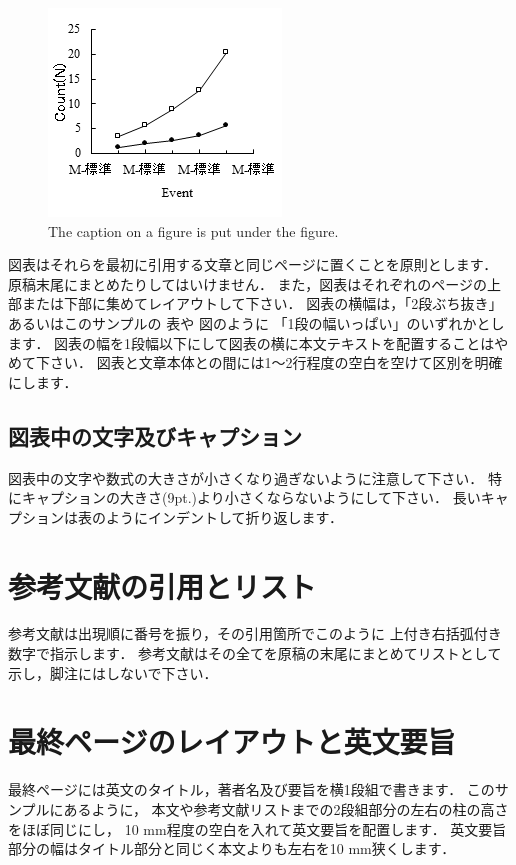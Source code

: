 \begin{figure}[H]
  \centering
  \includegraphics[keepaspectratio=true,width=0.9\linewidth,height=0.25\paperheight]{./assets/figure.png}
  \caption{The caption on a figure is put under the figure.}
  \label{figure:example figure}
\end{figure}

図表はそれらを最初に引用する文章と同じページに置くことを原則とします．
原稿末尾にまとめたりしてはいけません．
また，図表はそれぞれのページの上部または下部に集めてレイアウトして下さい．
図表の横幅は，「2段ぶち抜き」あるいはこのサンプルの
表や
図のように
「1段の幅いっぱい」のいずれかとします．
図表の幅を1段幅以下にして図表の横に本文テキストを配置することはやめて下さい．
図表と文章本体との間には1～2行程度の空白を空けて区別を明確にします．

\subsection{図表中の文字及びキャプション}

図表中の文字や数式の大きさが小さくなり過ぎないように注意して下さい．
特にキャプションの大きさ(9pt.)より小さくならないようにして下さい．
長いキャプションは表のようにインデントして折り返します．

\section{参考文献の引用とリスト}

参考文献は出現順に番号を振り，その引用箇所でこのように
\cite{物部水理学:inbook}
上付き右括弧付き数字で指示します．
参考文献はその全てを原稿の末尾にまとめてリストとして示し，脚注にはしないで下さい．

\section{最終ページのレイアウトと英文要旨}

最終ページには英文のタイトル，著者名及び要旨を横1段組で書きます．
このサンプルにあるように，
本文や参考文献リストまでの2段組部分の左右の柱の高さをほぼ同じにし，
10 mm程度の空白を入れて英文要旨を配置します．
英文要旨部分の幅はタイトル部分と同じく本文よりも左右を10 mm狭くします．
